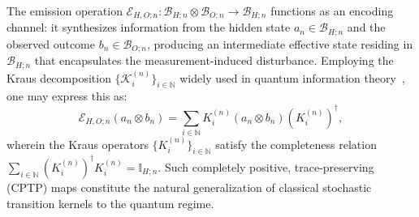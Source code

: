\documentclass[12pt, reco]{article}
\begin{document}
\begin{center}
\end{center}

The emission operation $\mathcal{E}_{H,O;n} : \mathcal{B}_{H;n} \otimes \mathcal{B}_{O;n} \to \mathcal{B}_{H;n}$ functions as an encoding channel: it synthesizes information from the hidden state $a_n \in \mathcal{B}_{H;n}$ and the observed outcome $b_n \in \mathcal{B}_{O;n}$, producing an intermediate effective state residing in $\mathcal{B}_{H;n}$ that encapsulates the measurement-induced disturbance. Employing the Kraus decomposition $\{\mathcal{K}_i^{(n)}\}_{i \in \mathbb{N}}$ widely used in quantum information theory~\cite{Nielsen2000}, one may express this as:
\begin{equation}
\mathcal{E}_{H,O;n}(a_n \otimes b_n) = \sum_{i \in \mathbb{N}} K_i^{(n)} (a_n \otimes b_n) (K_i^{(n)})^\dagger,
\end{equation}
wherein the Kraus operators $\{K_i^{(n)}\}_{i \in \mathbb{N}}$ satisfy the completeness relation $\sum_{i \in \mathbb{N}} (K_i^{(n)})^\dagger K_i^{(n)} = \mathbb{I}_{H;n}$. Such completely positive, trace-preserving (CPTP) maps constitute the natural generalization of classical stochastic transition kernels to the quantum regime.
\end{document}
